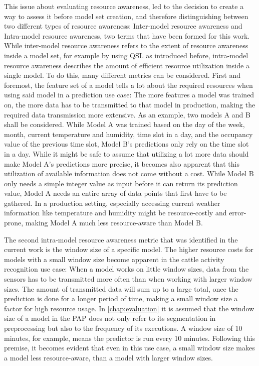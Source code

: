 This issue about evaluating resource awareness, led to the decision to create a way to assess it before model set creation, and therefore distinguishing between two different types of resource awareness: Inter-model resource awareness and Intra-model resource awareness, two terms that have been formed for this work. While inter-model resource awareness refers to the extent of resource awareness inside a model set, for example by using QSL as introduced before, intra-model resource awareness describes the amount of efficient resource utilization inside a single model. To do this, many different metrics can be considered. First and foremost, the feature set of a model tells a lot about the required resources when using said model in a prediction use case: The more features a model was trained on, the more data has to be transmitted to that model in production, making the required data transmission more extensive. As an example, two models A and B shall be considered. While Model A was trained based on the day of the week, month, current temperature and humidity, time slot in a day, and the occupancy value of the previous time slot, Model B's predictions only rely on the time slot in a day. While it might be safe to assume that utilizing a lot more data should make Model A’s predictions more precise, it becomes also apparent that this utilization of available information does not come without a cost. While Model B only needs a simple integer value as input before it can return its prediction value, Model A needs an entire array of data points that first have to be gathered. In a production setting, especially accessing current weather information like temperature and humidity might be resource-costly and error-prone, making Model A much less resource-aware than Model B. 

The second intra-model resource awareness metric that was identified in the current work is the window size of a specific model. The higher resource costs for models with a small window size become apparent in the cattle activity recognition use case: When a model works on little window sizes, data from the sensors has to be transmitted more often than when working with larger window sizes. The amount of transmitted data will sum up to a large total, once the prediction is done for a longer period of time, making a small window size a factor for high resource usage. In \autoref{chap:evaluation} it is assumed that the window size of a model in the PAP does not only refer to its segmentation in preprocessing but also to the frequency of its executions. A window size of 10 minutes, for example, means the predictor is run every 10 minutes. Following this premise, it becomes evident that even in this use case, a small window size makes a model less resource-aware, than a model with larger window sizes. 

